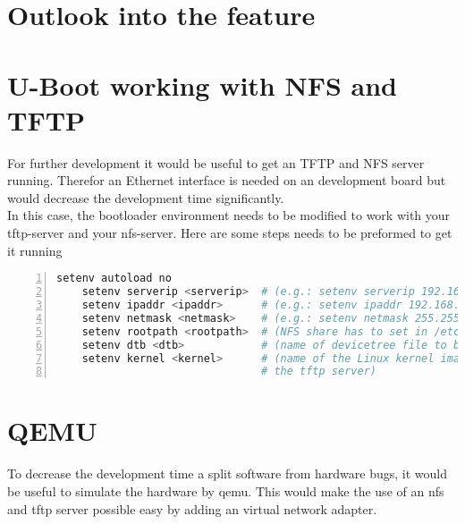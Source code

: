 
\chapter{Outlook into the feature}%
\label{cha:ausblick}


\chapter{U-Boot working with NFS and TFTP}%
\label{cha:U-Boot working with NFS and TFTP}

For further development it would be useful to get an TFTP and NFS server
running. Therefor an Ethernet interface is needed on an development board but
would decrease the development time significantly.
\\
In this case, the bootloader environment needs to be modified to work with your
tftp-server and your nfs-server. Here are some steps needs to be preformed to
get it running\\

\begin{lstlisting}[language=bash,numbers=left,caption=Configure U-Boot for NTFS
    and TFTP]
    setenv autoload no
    setenv serverip <serverip>  # (e.g.: setenv serverip 192.168.100.1)
    setenv ipaddr <ipaddr>      # (e.g.: setenv ipaddr 192.168.0.10)
    setenv netmask <netmask>    # (e.g.: setenv netmask 255.255.255.0)
    setenv rootpath <rootpath>  # (NFS share has to set in /etc/exports on the Computer that runs the NFS server first)
    setenv dtb <dtb>            # (name of devicetree file to be downloaded from the tftp server)
    setenv kernel <kernel>      # (name of the Linux kernel image to be downloaded from
                                # the tftp server)
\end{lstlisting}

\chapter{QEMU}%
\label{cha:QEMU}
To decrease the development time a split software from hardware bugs,
it would be useful to simulate the hardware by qemu.
This would make the use of an nfs and tftp server possible easy by adding an
virtual network adapter.
